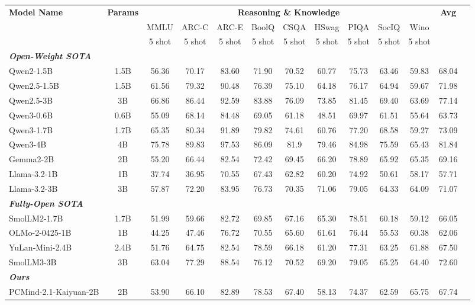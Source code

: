 \begin{tabular}{lcccccccccccc}
\toprule
\multirow{3}{*}{\textbf{Model Name}} & \multirow{3}{*}{\textbf{Params}} & \multicolumn{9}{c}{\textbf{Reasoning \& Knowledge}} & \multirow{3}{*}{\textbf{Avg}}\\
\cmidrule(lr){3-11}
 &  & MMLU & ARC-C & ARC-E & BoolQ & CSQA & HSwag & PIQA & SocIQ & Wino & \\
&  & 5 shot & 5 shot & 5 shot & 5 shot & 5 shot & 5 shot & 5 shot & 5 shot & 5 shot &\\
\midrule

\multicolumn{11}{l}{\textit{\textbf{Open-Weight SOTA}}} \\
\rowcolor{openweight} Qwen2-1.5B & 1.5B & 56.36 & 70.17 & 83.60 & 71.90 & 70.52 & 60.77 & 75.73 & 63.46 & 59.83 & 68.04\\
\rowcolor{openweight} Qwen2.5-1.5B & 1.5B & 61.56 & 79.32 & 90.48 & 76.39 & 75.10 & 64.18 & 76.17 & 64.94 & 59.67 & 71.98 \\
\rowcolor{openweight} Qwen2.5-3B & 3B & 66.86 & 86.44 & 92.59 & 83.88 & 76.09 & 73.85 & 81.45 & 69.40 & 63.69 & 77.14\\
\rowcolor{openweight} Qwen3-0.6B & 0.6B & 55.09 & 68.14 & 84.48 & 69.05 & 61.18 & 48.51 & 69.97 & 61.51 & 55.64 & 63.73 \\
\rowcolor{openweight} Qwen3-1.7B & 1.7B & 65.35 & 80.34 & 91.89 & 79.82 & 74.61 & 60.76 & 77.20 & 68.58 & 59.27 & 73.09\\
\rowcolor{openweight} Qwen3-4B & 4B & 75.78 & 89.83 & 97.53 & 86.09 & 81.9 & 79.46 & 84.98 & 75.59 & 65.43 & 81.84\\
\rowcolor{openweight} Gemma2-2B & 2B & 55.20 & 66.44 & 82.54 & 72.42 & 69.45 & 66.20 & 78.89 & 65.92 & 65.35 & 69.16\\
\rowcolor{openweight} Llama-3.2-1B & 1B & 37.74 & 36.95 & 70.55 & 67.43 & 62.82 & 60.20 & 74.92 & 50.61 & 58.17 & 57.71\\
\rowcolor{openweight} Llama-3.2-3B & 3B & 57.87 & 72.20 & 83.95 & 76.73 & 70.35 & 71.06 & 79.05 & 64.33 & 64.09 & 71.07\\

\multicolumn{11}{l}{\textit{\textbf{Fully-Open SOTA}}} \\
\rowcolor{fullyopen} SmolLM2-1.7B & 1.7B & 51.99 & 59.66 & 82.72 & 69.85 & 67.16 & 65.30 & 78.51 & 60.18 & 59.12 & 66.05\\
\rowcolor{fullyopen} OLMo-2-0425-1B & 1B & 44.25 & 47.46 & 76.72 & 70.55 & 65.60 & 61.61 & 76.44 & 55.53 & 60.38 & 62.06\\
\rowcolor{fullyopen} YuLan-Mini-2.4B & 2.4B & 51.76 & 64.75 & 82.54 & 78.59 & 66.18 & 61.20 & 77.31 & 63.25 & 61.88 & 67.50\\
\rowcolor{fullyopen} SmolLM3-3B & 3B & 63.04 & 77.29 & 88.54 & 76.12 & 70.52 & 69.20 & 79.05 & 65.25 & 64.40 & 72.60\\

\multicolumn{11}{l}{\textit{\textbf{Ours}}} \\
\rowcolor{ours} PCMind-2.1-Kaiyuan-2B & 2B & 53.90 & 66.10 & 82.89 & 78.53 & 67.40 & 58.13 & 74.37 & 62.59 & 65.75 & 67.74\\

\bottomrule
\end{tabular}%
